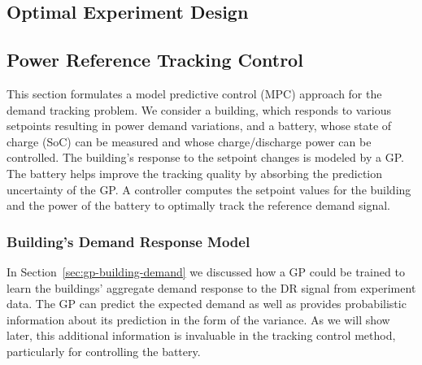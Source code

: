\subsection{Optimal Experiment Design}


\subsection{Power Reference Tracking Control}


This section formulates a model predictive control (MPC) approach for the demand tracking problem.
We consider a building, which responds to various setpoints resulting in power demand variations, and a battery, whose state of charge (SoC) can be measured and whose charge/discharge power can be controlled.
The building's response to the setpoint changes is modeled by a GP.
The battery helps improve the tracking quality by absorbing the prediction uncertainty of the GP.
A controller computes the setpoint values for the building and the power of the battery to optimally track the reference demand signal.


\subsubsection{Building's Demand Response Model}

In Section~\ref{sec:gp-building-demand} we discussed how a GP could be trained to learn the  buildings' aggregate demand response to the DR signal from experiment data. 
The GP  can predict the expected  demand  as well as provides probabilistic information about its prediction in the form of the variance.
As we will show later, this additional information is invaluable in the tracking control method, particularly for controlling the battery.

